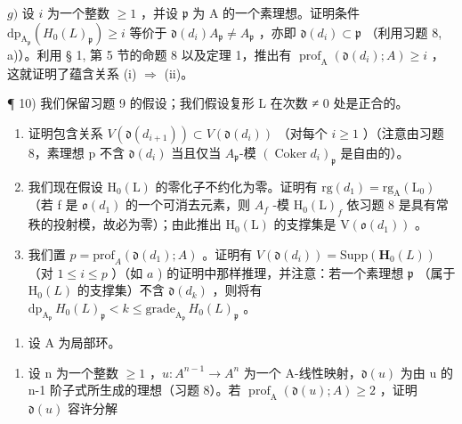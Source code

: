 \(g)\) 设 \(i\) 为一个整数 \(\geqslant 1\) ，并设 \(\mathfrak{p}\) 为 \(\mathrm{A}\) 的一个素理想。证明条件 \(\mathrm{dp}_{\mathrm{A}_{\mathfrak{p}}}(H_0(L)_{\mathfrak{p}}) \geqslant i\) 等价于 \(\mathfrak{d}(d_i)A_{\mathfrak{p}} \neq A_{\mathfrak{p}}\) ，亦即 \(\mathfrak{d}(d_i) \subset \mathfrak{p}\) （利用习题 8, a)）。利用 § 1, 第 5 节的命题 8 以及定理 1，推出有 \(\operatorname{prof}_{\mathrm{A}}(\mathfrak{d}(d_i); A) \geqslant i\) ，这就证明了蕴含关系 (i) \(\Rightarrow\) (ii)。

¶ 10) 我们保留习题 9 的假设；我们假设复形 L 在次数 ≠ 0 处是正合的。

\begin{enumerate}
\def\labelenumi{\alph{enumi})}
\item
  证明包含关系 \(V(\mathfrak{d}(d_{i+1})) \subset V(\mathfrak{d}(d_i))\) （对每个 \(i \geqslant 1\) ）（注意由习题 8，素理想 p 不含 \(\mathfrak{d}(d_i)\) 当且仅当 \(A_{\mathfrak{p}}\)-模 \((\operatorname{Coker} d_i)_{\mathfrak{p}}\) 是自由的）。
\item
  我们现在假设 \(\mathrm{H}_{0}(\mathrm{L})\) 的零化子不约化为零。证明有 \(\mathrm{rg}(d_{1}) = \mathrm{rg}_{\mathrm{A}}(\mathrm{L}_{0})\) （若 f 是 \(\mathfrak{o}(d_{1})\) 的一个可消去元素，则 \(A_{f}\) -模 \(\mathrm{H}_{0}(\mathrm{L})_{f}\) 依习题 8 是具有常秩的投射模，故必为零）；由此推出 \(\mathrm{H}_{0}(\mathrm{L})\) 的支撑集是 \(\mathrm{V}(\mathfrak{o}(d_{1}))\) 。
\item
  我们置 \(p = \text{prof}_A(\mathfrak{d}(d_1); A)\) 。证明有 \(V(\mathfrak{d}(d_i)) = \text{Supp}(\mathbf{H}_0(L))\) （对 \(1 \leqslant i \leqslant p\) ）（如 \(a\) ) 的证明中那样推理，并注意：若一个素理想 \(\mathfrak{p}\) （属于 \(\mathrm{H}_0(L)\) 的支撑集）不含 \(\mathfrak{d}(d_k)\) ，则将有 \(\text{dp}_{\mathrm{A}_{\mathfrak{p}}} \, H_0(L)_{\mathfrak{p}} < k \leqslant \text{grade}_{\mathrm{A}_{\mathfrak{p}}} \, H_0(L)_{\mathfrak{p}}\) 。
\end{enumerate}

\begin{enumerate}
\def\labelenumi{\arabic{enumi})}
\setcounter{enumi}{10}
\tightlist
\item
  设 A 为局部环。
\end{enumerate}

\begin{enumerate}
\def\labelenumi{\alph{enumi})}
\tightlist
\item
  设 n 为一个整数 \(\geqslant 1\) ，\(u : A^{n-1} \to A^n\) 为一个 A-线性映射，\(\mathfrak{d}(u)\) 为由 u 的 n-1 阶子式所生成的理想（习题 8）。若 \(\operatorname{prof}_{\mathrm{A}}(\mathfrak{d}(u); A) \geqslant 2\) ，证明 \(\mathfrak{d}(u)\) 容许分解
\end{enumerate}


